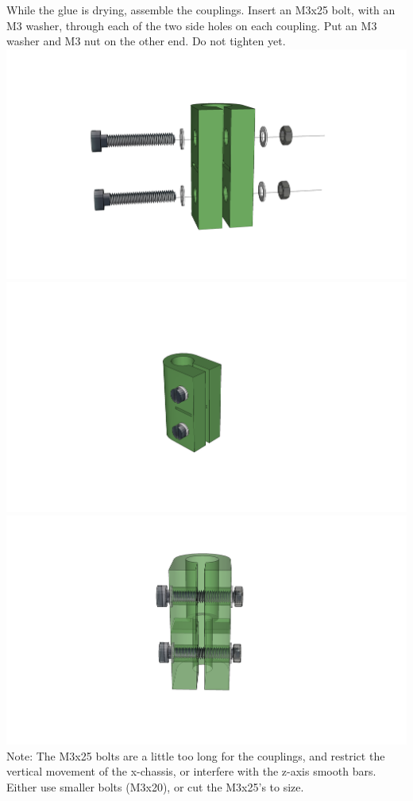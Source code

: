 \documentclass[twoside,openany,a4paper,titlepage]{memoir}
\begin{document}
	\section{}
	While the glue is drying, assemble the couplings. Insert an M3x25 bolt, with an M3 washer, through
	each of the two side holes on each coupling. Put an M3 washer and M3 nut on the other end. Do not
	tighten yet.\\
	\includegraphics[width=1\linewidth]{graphics/ch8_13_1.png}
	\includegraphics[width=1\linewidth]{graphics/ch8_13_2.png}
	\includegraphics[width=1\linewidth]{graphics/ch8_13_3.png}
	Note: The M3x25 bolts are a little too long for the couplings, and restrict the
	vertical movement of the x-chassis, or interfere with the z-axis smooth bars.
	Either use smaller bolts (M3x20), or cut the M3x25's to size.
	
\end{document}
